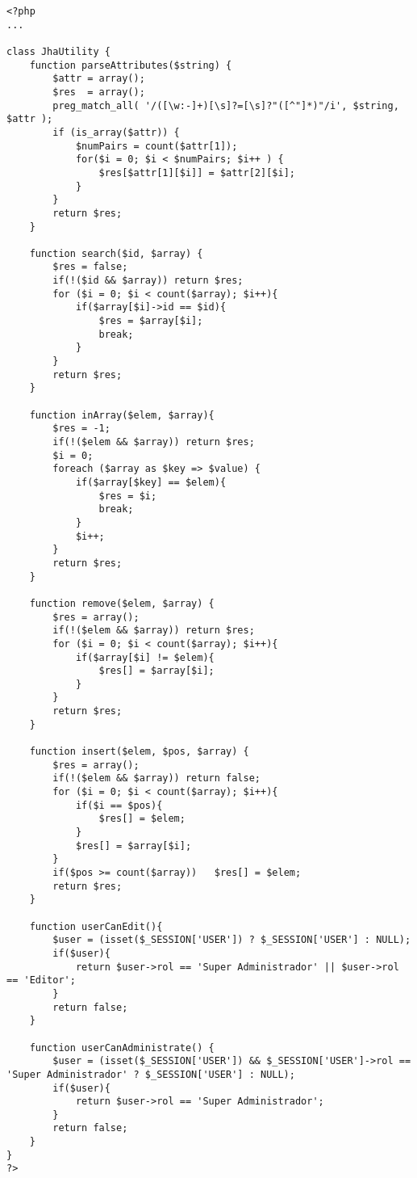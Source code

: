 \begin{lstlisting}[label=jha_utility,caption=Clase JhaUtility]
<?php
...

class JhaUtility {
	function parseAttributes($string) {
        $attr = array();
        $res  = array();
        preg_match_all( '/([\w:-]+)[\s]?=[\s]?"([^"]*)"/i', $string, $attr );
        if (is_array($attr)) {
            $numPairs = count($attr[1]);
            for($i = 0; $i < $numPairs; $i++ ) {
                $res[$attr[1][$i]] = $attr[2][$i];
            }
        }
        return $res;
    }
	
    function search($id, $array) {
    	$res = false;
    	if(!($id && $array)) return $res;
    	for ($i = 0; $i < count($array); $i++){
    		if($array[$i]->id == $id){
    			$res = $array[$i];
    			break;
    		}
    	}
    	return $res;
    }
    
    function inArray($elem, $array){
    	$res = -1;
        if(!($elem && $array)) return $res;
        $i = 0;
        foreach ($array as $key => $value) {
        	if($array[$key] == $elem){
                $res = $i;
                break;
            }
            $i++;
        }
        return $res;
    }
    
    function remove($elem, $array) {
        $res = array();
        if(!($elem && $array)) return $res;
        for ($i = 0; $i < count($array); $i++){
            if($array[$i] != $elem){
                $res[] = $array[$i];
            }
        }
        return $res;
    }
    
	function insert($elem, $pos, $array) {
        $res = array();
        if(!($elem && $array)) return false;
        for ($i = 0; $i < count($array); $i++){
            if($i == $pos){
                $res[] = $elem;
            }
            $res[] = $array[$i];
        }
        if($pos >= count($array))	$res[] = $elem;
        return $res;
    }
    
    function userCanEdit(){
    	$user = (isset($_SESSION['USER']) ? $_SESSION['USER'] : NULL);
    	if($user){
    		return $user->rol == 'Super Administrador' || $user->rol == 'Editor'; 
    	}
    	return false;
    }
    
	function userCanAdministrate() {
    	$user = (isset($_SESSION['USER']) && $_SESSION['USER']->rol == 'Super Administrador' ? $_SESSION['USER'] : NULL);
    	if($user){
    		return $user->rol == 'Super Administrador'; 
    	}
    	return false;
    }
}
?>
\end{lstlisting}
